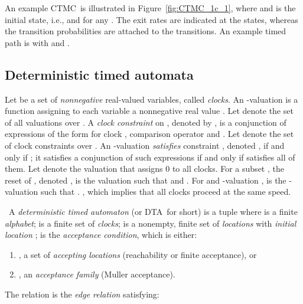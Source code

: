 \documentclass{LMCS}
\newcommand{\<}{\langle}
\renewcommand{\>}{\rangle}
\newcommand{\CTMC}{\textsc{{CTMC}}}
\newcommand{\DTA}{\textsc{DTA}}
\begin{document}
\begin{exa}
An example \CTMC\ is illustrated in Figure~\ref{fig:CTMC_1c_1}, where  and  is
the initial state, i.e.,  and  for any
. The exit rates are indicated at the states, whereas the
transition probabilities are attached to the transitions. An example
timed path is  with  and .
\end{exa}

\subsection{Deterministic timed automata}



\newcommand{\mCC}{\mathcal{C}\mathcal{C}}
\newcommand{\mRe}{\mathcal{R}e}

Let  be a set of \emph{nonnegative} real-valued variables,
called \emph{clocks}.
An -valuation is a function  assigning
to each variable  a nonnegative real value .
Let  denote the set of all valuations over .
A \emph{clock constraint} on , denoted by , is a conjunction of expressions
of the form  for clock , comparison operator  and .
Let  denote the set of clock constraints over .
An -valuation  \emph{satisfies} constraint , denoted
, if and only if ; it satisfies a conjunction
of such expressions if and only if  satisfies all of them.
Let  denote the valuation that assigns 0 to all clocks.
For a subset , the reset of , denoted , is the
valuation  such that  and
.
For  and -valuation , 
is the -valuation  such that . , which implies that all clocks proceed at the same speed.

\begin{defi}[\DTA]\ A \emph{deterministic timed automaton} (or
  \DTA\ for short)
is a tuple   where
 is a finite \emph{alphabet};  is a finite set of \emph{clocks};
 is a nonempty, finite set of \emph{locations} with \emph{initial location}
;  is the \emph{acceptance condition}, which is either:
\begin{enumerate}[]
\item
, a set of \emph{accepting locations} (reachability or finite acceptance), or
\item
, an \emph{acceptance family} (Muller acceptance).
\end{enumerate}
The relation  is the \emph{edge relation} satisfying:

\end{defi}
\end{document}
